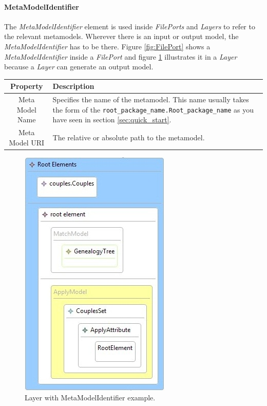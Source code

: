 \paragraph{MetaModelIdentifier}

The \emph{MetaModelIdentifier} element is used inside \emph{FilePorts} and
\emph{Layers} to refer to the relevant metamodels. Wherever there is an input or
output model, the \emph{MetaModelIdentifier} has to be there. Figure
\ref{fig:FilePort} shows a \emph{MetaModelIdentifier} inside a \emph{FilePort}
and figure \ref{fig:layer_mmid_model_apmodel} illustrates it in a \emph{Layer}
because a \emph{Layer} can generate an output model.

\begin{center}
  \begin{tabular}{ | c | p{\paragraphsize} | }
    \hline
    \textbf{Property} & \textbf{Description} \\ \hline
    Meta Model Name & Specifies the name of the metamodel. This name usually
  takes the form of the \verb=root_package_name.Root_package_name= as you have
  seen in section \ref{sec:quick_start}.  \\ \hline
    Meta Model URI & The relative or absolute path to the metamodel. \\ \hline
  \end{tabular}
\end{center}

\begin{figure}[h]
\begin{center}
  \includegraphics[scale=0.7]{imgs/layer_mmid_model_apmodel.jpg}
  \caption{Layer with MetaModelIdentifier example.}
  \label{fig:layer_mmid_model_apmodel}
\end{center}
\end{figure}




